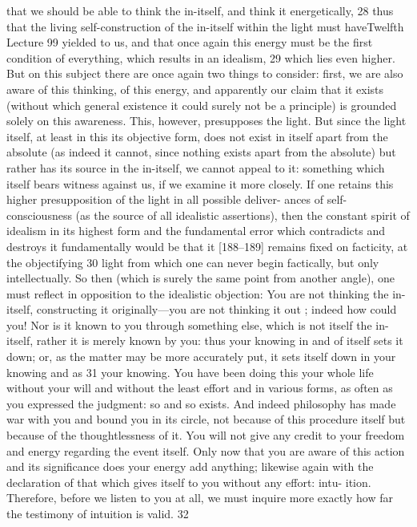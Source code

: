 that we should be able to think the in-itself, and think it energetically, 28 thus
that the living self-construction of the in-itself within the light must haveTwelfth Lecture
99
yielded to us, and that once again this energy must be the first condition of
everything, which results in an idealism, 29 which lies even higher.
But on this subject there are once again two things to consider: first, we
are also aware of this thinking, of this energy, and apparently our claim that it
exists (without which general existence it could surely not be a principle) is
grounded solely on this awareness. This, however, presupposes the light. But
since the light itself, at least in this its objective form, does not exist in itself
apart from the absolute (as indeed it cannot, since nothing exists apart from
the absolute) but rather has its source in the in-itself, we cannot appeal to it:
something which itself bears witness against us, if we examine it more closely.
If one retains this higher presupposition of the light in all possible deliver-
ances of self-consciousness (as the source of all idealistic assertions), then the
constant spirit of idealism in its highest form and the fundamental error
which contradicts and destroys it fundamentally would be that it [188–189]
remains fixed on facticity, at the objectifying 30 light from which one can never
begin factically, but only intellectually.
So then (which is surely the same point from another angle), one must
reflect in opposition to the idealistic objection: You are not thinking the in-
itself, constructing it originally—you are not thinking it out ; indeed how could
you! Nor is it known to you through something else, which is not itself the in-
itself, rather it is merely known by you: thus your knowing in and of itself sets
it down; or, as the matter may be more accurately put, it sets itself down in
your knowing and as 31 your knowing. You have been doing this your whole life
without your will and without the least effort and in various forms, as often as
you expressed the judgment: so and so exists. And indeed philosophy has made
war with you and bound you in its circle, not because of this procedure itself
but because of the thoughtlessness of it. You will not give any credit to your
freedom and energy regarding the event itself. Only now that you are aware of
this action and its significance does your energy add anything; likewise again
with the declaration of that which gives itself to you without any effort: intu-
ition. Therefore, before we listen to you at all, we must inquire more exactly
how far the testimony of intuition is valid. 32
